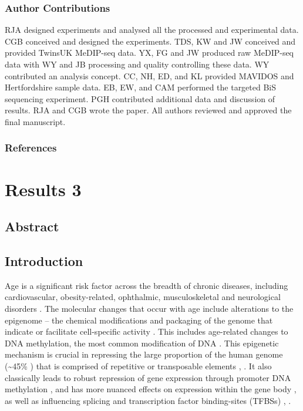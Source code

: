 \documentclass[
]{book}
\begin{document}
\hypertarget{author-contributions}{%
\section{Author Contributions}\label{author-contributions}}

RJA designed experiments and analysed all the processed and experimental data.
CGB conceived and designed the experiments.
TDS, KW and JW conceived and provided TwinsUK MeDIP-seq data.
YX, FG and JW produced raw MeDIP-seq data with WY and JB processing and quality controlling these data.
WY contributed an analysis concept.
CC, NH, ED, and KL provided MAVIDOS and Hertfordshire sample data.
EB, EW, and CAM performed the targeted BiS sequencing experiment.
PGH contributed additional data and discussion of results.
RJA and CGB wrote the paper.
All authors reviewed and approved the final manuscript.

\hypertarget{references}{%
\section{References}\label{references}}

\hypertarget{part-results-3}{%
\part{Results 3}\label{part-results-3}}

\hypertarget{abstract-3}{%
\chapter{Abstract}\label{abstract-3}}

\hypertarget{AluIntro}{%
\chapter{Introduction}\label{AluIntro}}

Age is a significant risk factor across the breadth of chronic diseases, including cardiovascular, obesity-related, ophthalmic, musculoskeletal and neurological disorders \citep{Partridge2018}.
The molecular changes that occur with age include alterations to the epigenome \citep{Booth2016} -- the chemical modifications and packaging of the genome that indicate or facilitate cell-specific activity \citep{Bird2007}.
This includes age-related changes to DNA methylation, the most common modification of DNA \citep{Lopez-Otin2013}.
This epigenetic mechanism is crucial in repressing the large proportion of the human genome (\textasciitilde45\% \citep{Gregory2005}) that is comprised of repetitive or transposable elements \citep{Deniz2019}, \citep{Kazazian2017}.
It also classically leads to robust repression of gene expression through promoter DNA methylation \citep{Deaton2011}, and has more nuanced effects on expression within the gene body \citep{Hellman2007}, as well as influencing splicing \citep{Shukla2011} and transcription factor binding-sites (TFBSs) \citep{Blattler2014}, \citep{Yin2017}.
\end{document}
